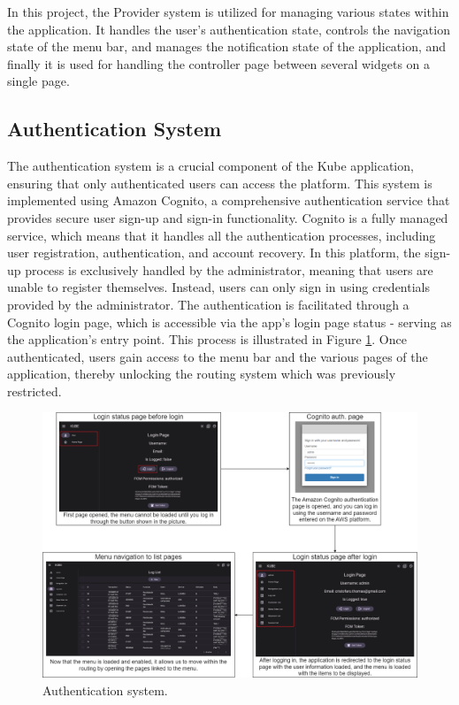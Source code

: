 In this project, the Provider system is utilized for managing various states within the application.
It handles the user's authentication state, controls the navigation state of the menu bar, and
manages the notification state of the application, and finally it is used for handling the
controller page between several widgets on a single page.

\subsection{Authentication System}
The authentication system is a crucial component of the Kube application, ensuring that only
authenticated users can access the platform. This system is implemented using Amazon Cognito, a
comprehensive authentication service that provides secure user sign-up and sign-in functionality.
Cognito is a fully managed service, which means that it handles all the authentication processes,
including user registration, authentication, and account recovery.
\newline\newline
In this platform, the sign-up process is exclusively handled by the administrator, meaning that
users are unable to register themselves. Instead, users can only sign in using credentials provided
by the administrator. The authentication is facilitated through a Cognito login page, which is
accessible via the app's login page status - serving as the application's entry point. This process
is illustrated in Figure \ref{fig:5_auth}. Once authenticated, users gain access to the menu bar and
the various pages of the application, thereby unlocking the routing system which was previously
restricted.

\begin{figure}
    \centering
    \includegraphics[scale=0.33]{Pictures/5_auth.png}
    \caption{Authentication system.}
    \label{fig:5_auth}
\end{figure}

